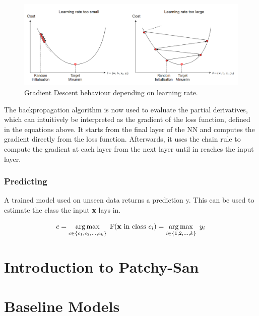 \begin{figure}[H]
  \centering
  \includegraphics[scale = 0.5]{Images/learningrate.png}
  \caption{Gradient Descent behaviour depending on learning rate.}
  \label{learnrate}
\end{figure}



The backpropagation algorithm is now used to evaluate the partial derivatives, which can intuitively be interpreted as the gradient of the loss function, defined in the equations above. It starts from the final layer of the NN and computes the gradient directly from the loss function. Afterwards, it uses the chain rule to compute the gradient at each layer from the next layer until in reaches the input layer. \\



\subsubsection*{Predicting}

A trained model used on unseen data returns a prediction y. This can be used to estimate the class the input \textbf{x} lays in.

\begin{equation}
  c = \operatorname*{arg\,max}_{c \in \{ c_1, c_2, ..., c_k\}} \ \mathbb{P}(\mathbf{x} \ \text{in class} \ c_i) = \operatorname*{arg\,max}_{i \in \{ 1, 2, ..., k\}} \ y_i
\end{equation}

\smallskip

\section{Introduction to Patchy-San}

\section{Baseline Models}

